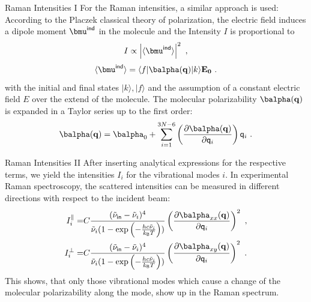 \documentclass[t]{beamer}
\newcommand{\boltz}{k_{\mathsf{B}}}             %
\begin{document}
\begin{frame}{Raman Intensities I}
	For the Raman intensities, a similar approach is used: According to the Placzek classical theory of polarization, the electric field induces a dipole moment $\bmu^\mathsf{ind}$ in the molecule and the Intensity $I$ is proportional to
	\begin{equation*}
		I \propto \left| \langle \bmu^\mathsf{ind} \rangle \right|^2~,
	\end{equation*}
	\begin{equation*}
		\langle \bmu^\mathsf{ind} \rangle = \langle f | \balpha(\mathbf{q}) | k \rangle \mathbf{E_0}~.
	\end{equation*}
	with the initial and final states $|k\rangle,|f\rangle$ and the assumption of a constant electric field $E$ over the extend of the molecule. The molecular polarizability $\balpha(\mathbf{q})$ is expanded in a Taylor series up to the first order:
	\begin{equation*}
		\balpha(\mathbf{q}) = \balpha_0 + \sum_{i=1}^{3N-6} \left( \frac{\partial\balpha(\mathbf{q})}{\partial \mathsf{q}_i} \right) \mathsf{q}_i~.
	\end{equation*}
\end{frame}
\begin{frame}{Raman Intensities II}
	After inserting analytical expressions for the respective terms, we yield the intensities $I_i$ for the vibrational modes $i$. In experimental Raman spectroscopy, the scattered intensities can be measured in different directions with respect to the incident beam:
	\begin{align*}
		I_i^\parallel = & C \frac{(\tilde{\nu}_\mathsf{in} - \tilde{\nu}_i)^4}{\tilde{\nu}_i (1- \exp\left(-\frac{hc\tilde{\nu}_i}{\boltz T}\right))} \left( \frac{\partial\balpha_{xx}(\mathbf{q})}{\partial \mathsf{q}_i} \right)^2~, \\
		I_i^\perp =     & C \frac{(\tilde{\nu}_\mathsf{in} - \tilde{\nu}_i)^4}{\tilde{\nu}_i (1- \exp\left(-\frac{hc\tilde{\nu}_i}{\boltz T}\right))} \left( \frac{\partial\balpha_{xy}(\mathbf{q})}{\partial \mathsf{q}_i} \right)^2~.
	\end{align*}
	This shows, that only those vibrational modes which cause a change of the molecular polarizability along the mode, show up in the Raman spectrum.
\end{frame}
\end{document}
